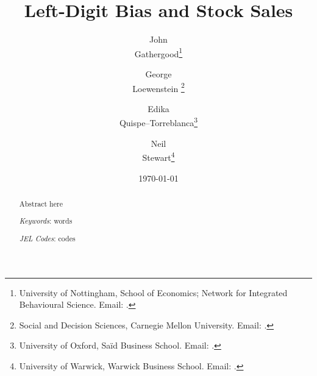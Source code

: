 
\title{\textbf{\Large{Left-Digit Bias and Stock Sales}}}

\singlespacing

\author{%
   John \\ Gathergood\thanks{University of Nottingham, School of Economics; Network for Integrated Behavioural Science. Email: .}%
   \and%
   George \\ Loewenstein%
   \thanks{Social and Decision Sciences, Carnegie Mellon University. Email: .}%
   \and%
   Edika \\ Quispe--Torreblanca\thanks{University of Oxford, Sa\"{i}d Business School. Email: .}%
    \and%
   Neil \\ Stewart\thanks{University of Warwick, Warwick Business School. Email: .}%
}

\date{%
	\vspace{1cm}\large%
	\today%
	\normalsize\\[1cm]%
}

\maketitle

\onehalfspacing

\begin{abstract}
   \noindent Abstract here
   
   \vspace{2ex}\noindent%
   \textit{Keywords}: words

   \vspace{.5ex}\noindent%
   \textit{JEL Codes}: codes%
\end{abstract}
